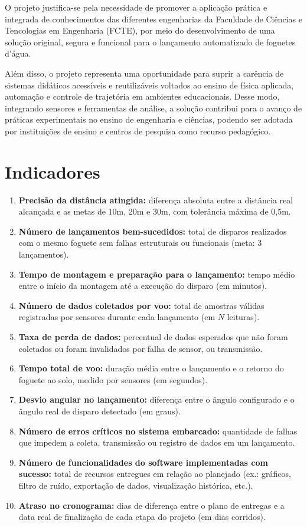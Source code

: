 O projeto justifica-se pela necessidade de promover a aplicação prática e integrada de conhecimentos das diferentes engenharias da Faculdade de Ciências e Tencologias em Engenharia (FCTE), por meio do desenvolvimento de uma solução original, segura e funcional para o lançamento automatizado de foguetes d’água. 

Além disso, o projeto representa uma oportunidade para suprir a carência de sistemas didáticos acessíveis e reutilizáveis voltados ao ensino de física aplicada, automação e controle de trajetória em ambientes educacionais. Desse modo, integrando sensores e ferramentas de análise, a solução contribui para o avanço de práticas experimentais no ensino de engenharia e ciências, podendo ser adotada por instituições de ensino e centros de pesquisa como recurso pedagógico. 



\section{Indicadores}

\begin{enumerate}
  \item \textbf{Precisão da distância atingida:} diferença absoluta entre a distância real alcançada e as metas de 10m, 20m e 30m, com tolerância máxima de 0,5m.
  \item \textbf{Número de lançamentos bem-sucedidos:} total de disparos realizados com o mesmo foguete sem falhas estruturais ou funcionais (meta: 3 lançamentos).
  \item \textbf{Tempo de montagem e preparação para o lançamento:} tempo médio entre o início da montagem até a execução do disparo (em minutos).
  \item \textbf{Número de dados coletados por voo:} total de amostras válidas registradas por sensores durante cada lançamento (em $N$ leituras).
  \item \textbf{Taxa de perda de dados:} percentual de dados esperados que não foram coletados ou foram invalidados por falha de sensor, ou transmissão.
  \item \textbf{Tempo total de voo:} duração média entre o lançamento e o retorno do foguete ao solo, medido por sensores (em segundos).
  \item \textbf{Desvio angular no lançamento:} diferença entre o ângulo configurado e o ângulo real de disparo detectado (em graus).
  \item \textbf{Número de erros críticos no sistema embarcado:} quantidade de falhas que impedem a coleta, transmissão ou registro de dados em um lançamento.
  \item \textbf{Número de funcionalidades do software implementadas com sucesso:} total de recursos entregues em relação ao planejado (ex.: gráficos, filtro de ruído, exportação de dados, visualização histórica, etc.).
  \item \textbf{Atraso no cronograma:} dias de diferença entre o plano de entregas e a data real de finalização de cada etapa do projeto (em dias corridos).
\end{enumerate}
